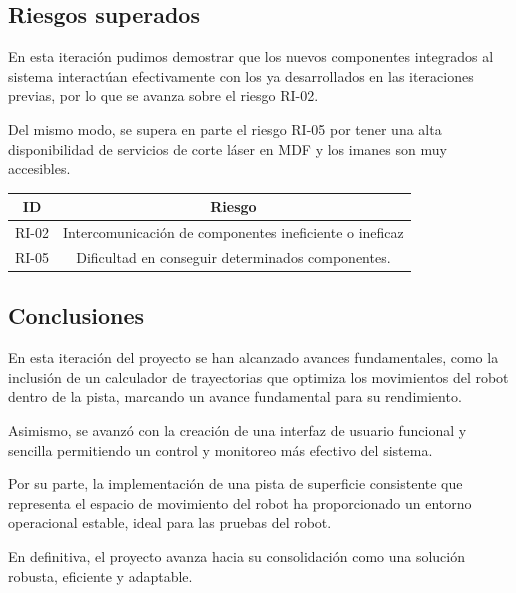 \subsection{Riesgos superados}
En esta iteración pudimos demostrar que los nuevos componentes integrados al sistema interactúan efectivamente con los ya desarrollados en las iteraciones previas, por lo que se avanza sobre el riesgo RI-02.

Del mismo modo, se supera en parte el riesgo RI-05 por tener una alta disponibilidad de servicios de corte láser en MDF y los imanes son muy accesibles.

\begin{center}
\begin{tabular}{|c|c|} 
    \hline
        ID & Riesgo \\
    \hline
        RI-02 & Intercomunicación de componentes ineficiente o ineficaz \\
    \hline
        RI-05 & Dificultad en conseguir determinados componentes. \\
    \hline
\end{tabular}
\end{center}

\subsection{Conclusiones}

En esta iteración del proyecto se han alcanzado avances fundamentales, como la inclusión de un calculador de trayectorias que optimiza los movimientos del robot dentro de la pista, marcando un avance fundamental para su rendimiento.

Asimismo, se avanzó con la creación de una interfaz de usuario funcional y sencilla permitiendo un control y monitoreo más efectivo del sistema. 

Por su parte, la implementación de una pista de superficie consistente que representa el espacio de movimiento del robot ha proporcionado un entorno operacional estable, ideal para las pruebas del robot.

En definitiva, el proyecto avanza hacia su consolidación como una solución robusta, eficiente y adaptable.